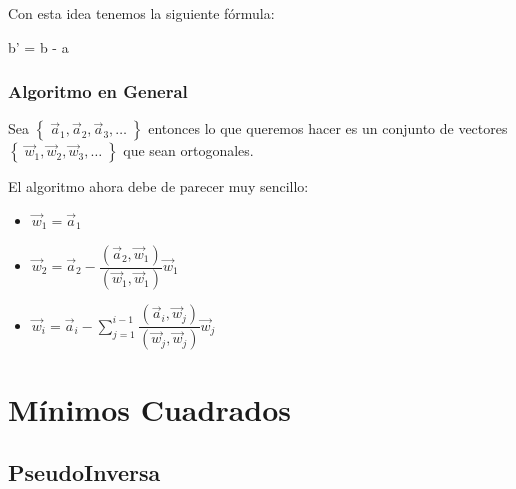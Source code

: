\documentclass[12pt, fleqn]{report}                             %
\def \Eq {equation}                                             %
\newenvironment{MultiLineEquation*}[1]                          %
        {\begin{\Eq*}\begin{alignedat}{#1}}                         %
        {\end{alignedat}\end{\Eq*}}                                 %
\theoremstyle{break}                                            %
\newcommand{\Set}[1]            {\left\{ \; #1 \; \right\}}     %
\begin{document}
                Con esta idea tenemos la siguiente fórmula:
                \begin{MultiLineEquation*}{3}
                    \vec b' = \vec b -  \vec a
                \end{MultiLineEquation*}

            \subsection{Algoritmo en General}

                Sea $\Set{\vec a_1, \vec a_2, \vec a_3, \dots}$ entonces lo que queremos hacer
                es un conjunto de vectores $\Set{\vec w_1, \vec w_2, \vec w_3, \dots}$ que sean
                ortogonales.

                El algoritmo ahora debe de parecer muy sencillo:
                \begin{itemize}
                    \item $\vec w_1 = \vec a_1$
                    \item $\vec w_2 = \vec a_2 - \dfrac{(\vec a_2, \vec w_1)}{(\vec w_1, \vec w_1)} \vec w_1$
                    \item $\vec w_i 
                        = \vec a_i - \displaystyle \sum_{j = 1}^{i-1} \dfrac{(\vec a_i, \vec w_j)}{(\vec w_j, \vec w_j)} \vec w_j$
                \end{itemize}
                

    \chapter{Mínimos Cuadrados}

        \clearpage
        \section{PseudoInversa}
\end{document}
